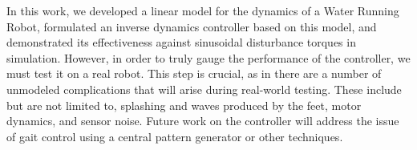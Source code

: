 In this work, we developed a linear model for the dynamics of a Water Running Robot, formulated an inverse dynamics controller based on this model, and demonstrated its effectiveness against sinusoidal disturbance torques in simulation. However, in order to truly gauge the performance of the controller, we must test it on a real robot. This step is crucial, as in there are a number of unmodeled complications that will arise during real-world testing. These include but are not limited to, splashing and waves produced by the feet, motor dynamics, and sensor noise. Future work on the controller will address the issue of gait control using a central pattern generator or other techniques.

